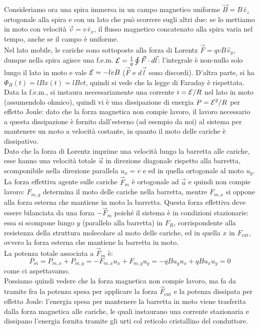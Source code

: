 Consideriamo ora una spira immersa in un campo magnetico uniforme $ \vec{B} = B \,\hat{e}_z $ ortogonale alla spira e con un lato che può scorrere sugli altri due: se lo mettiamo in moto con velocità $ \vec{v} = v \,\hat{e}_x $, il flusso magnetico concatenato alla spira varia nel tempo, anche se il campo è uniforme. \\ 
%
Nel lato mobile, le cariche sono sottoposte alla forza di Lorentz $ \vec{F} = qvB \,\hat{e}_y $, dunque nella spira agisce una f.e.m. $ \mathcal{E} = \frac{1}{q} \oint \vec{F}\cdot d\vec{l} $: l'integrale è non-nullo solo lungo il lato in moto e vale $ \mathcal{E} = -lvB $ ($ \vec{F} $ e $ d\vec{l} $ sono discordi). D'altra parte, si ha $ \Phi_B(t) = lB x(t) = lB v t $, quindi si vede che la legge di Faraday è rispettata. \\ 
%
Data la f.e.m., si instaura necessariamente una corrente $ i = \mathcal{E} / R $ nel lato in moto (assumendolo ohmico), quindi vi è una dissipazione di energia $ P = \mathcal{E}^2 / R $ per effetto Joule: dato che la forza magnetica non compie lavoro, il lavoro necessario a questa dissipazione è fornito dall'esterno (ad esempio da noi) al sistema per mantenere un moto a velocità costante, in quanto il moto delle cariche è dissipativo. \\ 
%
Dato che la forza di Lorentz imprime una velocità lungo la barretta alle cariche, esse hanno una velocità totale $ \vec{u} $ in direzione diagonale rispetto alla barretta, scomponibile nella direzione parallela $ u_x = v $ e ed in quella ortogonale al moto $ u_y $. La forza effettiva agente sulle cariche $ \vec{F}_m $ è ortogonale ad $ \vec{u} $ e quindi non compie lavoro: $ F_{m,y} $ determina il moto delle cariche nella barretta, mentre $ F_{m,x} $ si oppone alla forza esterna che mantiene in moto la barretta. Questa forza effettiva deve essere bilanciata da una forza $ -\vec{F}_m $ poiché il sistema è in condizioni stazionarie: essa si scompone lungo $ y $ (parallelo alla barretta) in $ F_R $, corrispondente alla resistenza della struttura molecolare al moto delle cariche, ed in quella $ x $ in $ F_{\text{ext}} $, ovvero la forza esterna che mantiene la barretta in moto. \\ 
%
La potenza totale associata a $ \vec{F}_m $  è:
\begin{equation}
	P_m = P_{m,x} + P_{m,y} = -F_{m,x}u_x + F_{m,y}u_y = -qBu_yu_x + qBu_xu_y = 0
	\label{eq:5}
\end{equation}
come ci aspettavamo. \\ 
%
Possiamo quindi vedere che la forza magnetica non compie lavoro, ma fa da tramite fra la potenza spesa per applicare la forza $ \vec{F}_{\text{ext}} $ e la potenza dissipata per effetto Joule: l'energia spesa per mantenere la barretta in moto viene trasferita dalla forza magnetica alle cariche, le quali instaurano una corrente stazionaria e dissipano l'energia fornita tramite gli urti col reticolo cristallino del conduttore.

